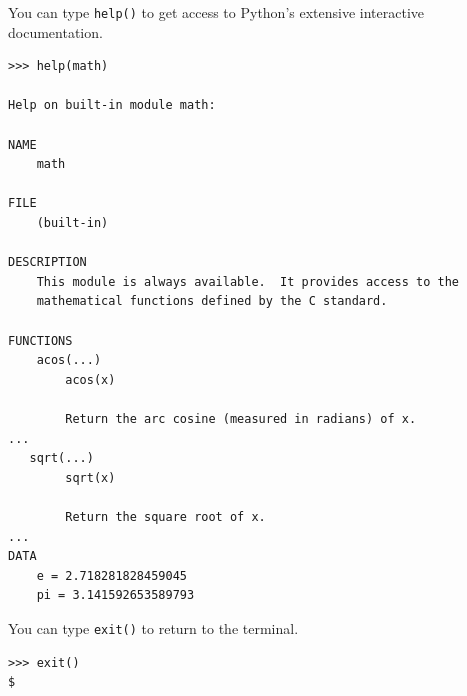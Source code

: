 \documentclass[8pt,a4paper,compress,handout]{beamer}
\begin{document}
\begin{frame}[fragile]
You can type \lstinline{help()} to get access to Python's extensive interactive documentation.
\begin{lstlisting}[language={}]
>>> help(math)

Help on built-in module math:

NAME
    math

FILE
    (built-in)

DESCRIPTION
    This module is always available.  It provides access to the
    mathematical functions defined by the C standard.

FUNCTIONS
    acos(...)
        acos(x)
        
        Return the arc cosine (measured in radians) of x.
...
   sqrt(...)
        sqrt(x)
        
        Return the square root of x. 
...
DATA
    e = 2.718281828459045
    pi = 3.141592653589793
\end{lstlisting}

\bigskip

You can type \lstinline{exit()} to return to the terminal.
\begin{lstlisting}[language={}]
>>> exit()
$
\end{lstlisting}
\end{frame}
\end{document}
